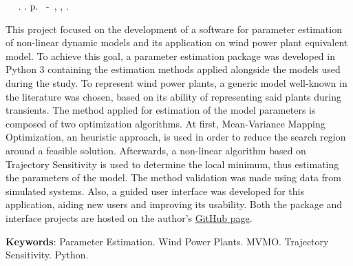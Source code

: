 \begin{resumo}

\begin{flushleft} 
	\setlength{\absparsep}{0pt} %
	\SingleSpacing 
 	\imprimirautorabr~ ~\textbf{\imprimirtitulo}.	\imprimirdata.  \pageref{LastPage}p. 
	\imprimirtipotrabalho~-~\imprimirinstituicao, \imprimirlocal, 	\imprimirdata. 
\end{flushleft}

\OnehalfSpacing

This project focused on the development of a software for parameter estimation of non-linear dynamic models and its application on wind power plant equivalent model. To achieve this goal, a parameter estimation package was developed in Python 3 containing the estimation methods applied alongside the models used during the study. To represent wind power plants, a generic model well-known in the literature was chosen, based on its ability of representing said plants during transients. The method applied for estimation of the model parameters is composed of two optimization algorithms. At first, Mean-Variance Mapping Optimization, an heuristic approach, is used in order to reduce the search region around a feasible solution. Afterwards, a non-linear algorithm based on Trajectory Sensitivity is used to determine the local minimum, thus estimating the parameters of the model. The method validation was made using data from simulated systems. Also, a guided user interface was  developed for this application, aiding new users and improving its usability. Both the package and interface projects are hosted on the author's \href{https://github.com/gnegrelli}{GitHub page}.

\textbf{Keywords}: Parameter Estimation. Wind Power Plants. MVMO. Trajectory Sensitivity. Python.

\end{resumo}
